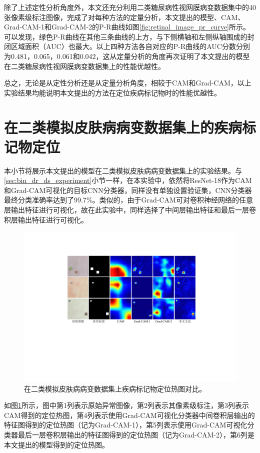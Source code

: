 除了上述定性分析角度外，本文还充分利用二类糖尿病性视网膜病变数据集中的40张像素级标注图像，完成了对每种方法的定量分析，本文提出的模型、CAM、Grad-CAM-1和Grad-CAM-2的P-R曲线如图\ref{fig:retinal_image_pr_curve}所示。可以发现，绿色P-R曲线在其他三条曲线的上方，与下侧横轴和左侧纵轴围成的封闭区域面积（AUC）也最大。以上四种方法各自对应的P-R曲线的AUC分数分别为0.481，0.065，0.061和0.042，这从定量分析的角度再次证明了本文提出的模型在二类糖尿病性视网膜病变数据集上的性能优越性。

总之，无论是从定性分析还是从定量分析角度，相较于CAM和Grad-CAM，以上实验结果均能说明本文提出的方法在定位疾病标记物时的性能优越性。
\section{在二类模拟皮肤病病变数据集上的疾病标记物定位}\label{sec:bin_simulated_ds_experiment}
本小节将展示本文提出的模型在二类模拟皮肤病病变数据集上的实验结果。与\ref{sec:bin_dr_ds_experiment}小节一样，在本实验中，依然将ResNet-18作为CAM和Grad-CAM可视化的目标CNN分类器，同样没有单独设置验证集，CNN分类器最终分类准确率达到了99.7\%。类似的，由于Grad-CAM可对卷积神经网络的任意层输出特征进行可视化，故在此实验中，同样选择了中间层输出特征和最后一层卷积层输出特征进行可视化。
\begin{figure}[h]
	\centering
	\includegraphics[width=1.0\textwidth]{figure/pr_curve_skin_image.pdf}
	\caption[在二类模拟皮肤病病变数据集上疾病标记物定位热图对比]{在二类模拟皮肤病病变数据集上疾病标记物定位热图对比。} 
	\label{fig:simulated_skin}
\end{figure}

如图\ref{fig:simulated_skin}所示，图中第1列表示原始异常图像，第2列表示其像素级标注，第3列表示CAM得到的定位热图，第4列表示使用Grad-CAM可视化分类器中间卷积层输出的特征图得到的定位热图（记为Grad-CAM-1），第5列表示使用Grad-CAM可视化分类器最后一层卷积层输出的特征图得到的定位热图（记为Grad-CAM-2），第6列是本文提出的模型得到的定位热图。


